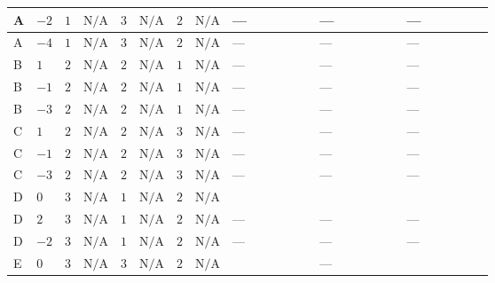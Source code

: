 \documentclass[8pt]{article}
\begin{document}
\begin{landscape}
\begin{longtable}{@{}llcccccc >{\raggedright\arraybackslash}p{0.21\linewidth} >{\raggedright\arraybackslash}p{0.21\linewidth} >{\raggedright\arraybackslash}p{0.21\linewidth}@{}}
\midrule
A & $-2$ & $1$ & $\text{N/A}$ & $3$ & $\text{N/A}$ & $2$ & $\text{N/A}$ & --- & --- & --- \\
\midrule
A & $-4$ & $1$ & $\text{N/A}$ & $3$ & $\text{N/A}$ & $2$ & $\text{N/A}$ & --- & --- & --- \\
\midrule
B & $1$ & $2$ & $\text{N/A}$ & $2$ & $\text{N/A}$ & $1$ & $\text{N/A}$ & --- & --- & --- \\
\midrule
B & $-1$ & $2$ & $\text{N/A}$ & $2$ & $\text{N/A}$ & $1$ & $\text{N/A}$ & --- & --- & --- \\
\midrule
B & $-3$ & $2$ & $\text{N/A}$ & $2$ & $\text{N/A}$ & $1$ & $\text{N/A}$ & --- & --- & --- \\
\midrule
C & $1$ & $2$ & $\text{N/A}$ & $2$ & $\text{N/A}$ & $3$ & $\text{N/A}$ & --- & --- & --- \\
\midrule
C & $-1$ & $2$ & $\text{N/A}$ & $2$ & $\text{N/A}$ & $3$ & $\text{N/A}$ & --- & --- & --- \\
\midrule
C & $-3$ & $2$ & $\text{N/A}$ & $2$ & $\text{N/A}$ & $3$ & $\text{N/A}$ & --- & --- & --- \\
\midrule
D & $0$ & $3$ & $\text{N/A}$ & $1$ & $\text{N/A}$ & $2$ & $\text{N/A}$ & \scriptsize\adjustbox{max width=\linewidth}{$\begin{gathered} {\lambda_{X_{14}}} (6 \operatorname{Tr}\!\left({Y_d}\,\left({Y_d}\right)^{\dagger}\right)+2 \operatorname{Tr}\!\left({Y_e}\,\left({Y_e}\right)^{\dagger}\right)+6 \operatorname{Tr}\!\left({Y_u}\,\left({Y_u}\right)^{\dagger}\right))\end{gathered}$} & \scriptsize\adjustbox{max width=\linewidth}{$\begin{gathered} +4 \left({\lambda_5}\right)^{*} (\left({\lambda_{X_{5}}^{(1)}}\right)^{*}+2 \left({\lambda_{X_{18}}}\right)^{*})\end{gathered}$} & \scriptsize\adjustbox{max width=\linewidth}{$\begin{gathered} -\frac{21 {g_2}^2 {\lambda_{X_{14}}}}{2}\end{gathered}$} \\
\midrule
D & $2$ & $3$ & $\text{N/A}$ & $1$ & $\text{N/A}$ & $2$ & $\text{N/A}$ & --- & --- & --- \\
\midrule
D & $-2$ & $3$ & $\text{N/A}$ & $1$ & $\text{N/A}$ & $2$ & $\text{N/A}$ & --- & --- & --- \\
\midrule
E & $0$ & $3$ & $\text{N/A}$ & $3$ & $\text{N/A}$ & $2$ & $\text{N/A}$ & \scriptsize\adjustbox{max width=\linewidth}{$\begin{gathered} {\lambda_{X_{14}}} (6 \operatorname{Tr}\!\left({Y_d}\,\left({Y_d}\right)^{\dagger}\right)+2 \operatorname{Tr}\!\left({Y_e}\,\left({Y_e}\right)^{\dagger}\right)+6 \operatorname{Tr}\!\left({Y_u}\,\left({Y_u}\right)^{\dagger}\right))\end{gathered}$} & --- & \scriptsize\adjustbox{max width=\linewidth}{$\begin{gathered} -\frac{33 {g_2}^2 {\lambda_{X_{14}}}}{2}\end{gathered}$} \\

\end{longtable}
\end{landscape}
\end{document}
